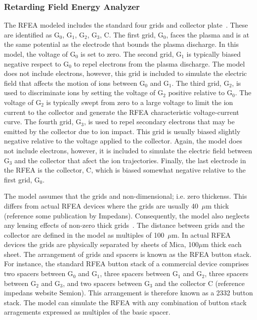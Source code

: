 \subsubsection{\label{RFEA}Retarding Field Energy Analyzer}
The RFEA modeled includes the standard four grids and collector plate~\cite{Hutchinson1987}. These are identified as G$_0$, G$_1$, G$_2$, G$_3$, C. The first grid, G$_0$, faces the plasma and is at the same potential as the electrode that bounds the plasma discharge. In this model, the voltage of G$_0$ is set to zero. The second grid, G$_1$ is typically biased negative respect to G$_0$ to repel electrons from the plasma discharge. The model does not include electrons, however, this grid is included to simulate the electric field that affects the motion of ions between G$_0$ and G$_1$. The third grid, G$_2$, is used to discriminate ions by setting the voltage of G$_2$ positive relative to G$_0$. The voltage of G$_2$ is typically swept from zero to a large voltage to limit the ion current to the collector and generate the RFEA characteristic voltage-current curve. The fourth grid, G$_3$, is used to repel secondary electrons that may be emitted by the collector due to ion impact. This grid is usually biased slightly negative relative to the voltage applied to the collector. Again, the model does not include electrons, however, it is included to simulate the electric field between G$_3$ and the collector that afect the ion trajectories. Finally, the last electrode in the RFEA is the collector, C, which is biased somewhat negative relative to the first grid, G$_0$.

The model assumes that the grids and non-dimensional; i.e. zero thickenss. This differs from actual RFEA devices where the grids are usually 40~$\mu$m thick (reference some publication by Impedans). Consequently, the model also neglects any lensing effects of non-zero thick grids~\cite{vandeVen2018,Buiter2018}. The distance between grids and the collector are defined in the model as multiples of 100~$\mu$m. In actual RFEA devices the grids are physically separated by sheets of Mica, 100$\mu$m thick each sheet. The arrangement of grids and spacers is known as the RFEA button stack. For instance, the standard RFEA button stack of a commercial device comprises two spacers between G$_0$ and G$_1$, three spacers between G$_1$ and G$_2$, three spacers between G$_2$ and G$_3$, and two spacers between G$_3$ and the collector C (reference impedans website Semion). This arrangement is therefore known as a 2332 button stack. The model can simulate the RFEA with any combination of button stack arragements expressed as multiples of the basic spacer. 

